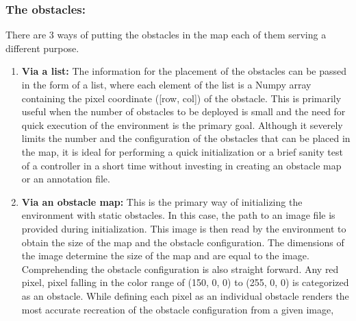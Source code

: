 \subsubsection*{The obstacles:}
There are 3 ways of putting the obstacles in the map each of them serving a different purpose.
\begin{enumerate}
\item \textbf{Via a list:}
The information for the placement of the obstacles can be passed in the form of a list, where each element of the list is a Numpy array containing the pixel coordinate ([row, col]) of the obstacle. This is primarily useful when the number of obstacles to be deployed is small and the need for quick execution of the environment is the primary goal. Although it severely limits the number and the configuration of the obstacles that can be placed in the map, it is ideal for performing a quick initialization or a brief sanity test of a controller in a short time without investing in creating an obstacle map or an annotation file.
\item \textbf{Via an obstacle map:}
This is the primary way of initializing the environment with static obstacles. In this case, the path to an image file is provided during initialization. This image is then read by the environment to obtain the size of the map and the obstacle configuration. 
The dimensions of the image determine the size of the map and are equal to the image. Comprehending the obstacle configuration is also straight forward. Any red pixel, pixel falling in the color range of (150, 0, 0) to (255, 0, 0) is categorized as an obstacle. While defining each pixel as an individual obstacle renders the most accurate recreation of the obstacle configuration from a given image, 


\end{enumerate}
